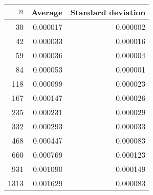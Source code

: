 \begin{tabular}{rrr}
$n$ & Average & Standard deviation\\\hline
30 & 0.000017 & 0.000002\\
42 & 0.000033 & 0.000016\\
59 & 0.000036 & 0.000004\\
84 & 0.000053 & 0.000001\\
118 & 0.000099 & 0.000023\\
167 & 0.000147 & 0.000026\\
235 & 0.000231 & 0.000029\\
332 & 0.000293 & 0.000033\\
468 & 0.000447 & 0.000083\\
660 & 0.000769 & 0.000123\\
931 & 0.001090 & 0.000149\\
1313 & 0.001629 & 0.000083\\
\end{tabular}
